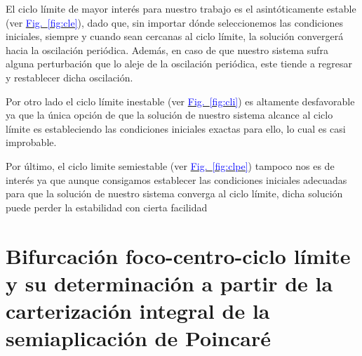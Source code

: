 \documentclass[12pt,a4paper]{report} %
\newcommand{\fref}[1]{\hyperref[#1]{\textcolor{blue}{Fig.~\ref*{#1}}}}
\newcommand{\eref}[1]{\hyperref[#1]{\textcolor{blue}{(\ref*{#1})}}}
\begin{document}
	\vspace{0.5cm} El ciclo límite de mayor interés para nuestro trabajo es el asintóticamente estable (ver \fref{fig:cle}), dado que, sin importar dónde seleccionemos las condiciones iniciales, siempre y cuando sean cercanas al ciclo límite, la solución convergerá hacia la oscilación periódica. Además, en caso de que nuestro sistema sufra alguna perturbación que lo aleje de la oscilación periódica, este tiende a regresar y restablecer dicha oscilación.
	
	\vspace{0.5cm}Por otro lado el ciclo límite inestable (ver \fref{fig:cli}) es altamente desfavorable ya que la única opción de que la solución de nuestro sistema alcance al ciclo límite es estableciendo las condiciones iniciales exactas para ello, lo cual es casi improbable.
	
	\vspace{0.5cm} Por último, el ciclo limite semiestable (ver \fref{fig:clpe}) tampoco nos es de interés ya que aunque consigamos establecer las condiciones iniciales adecuadas para que la solución de nuestro sistema converga al ciclo límite, dicha solución puede perder la estabilidad con cierta facilidad
	
	\newpage
	
	\section{Bifurcación foco-centro-ciclo límite y su determinación a partir de la carterización integral de la semiaplicación de Poincaré}
	

	
\end{document}

